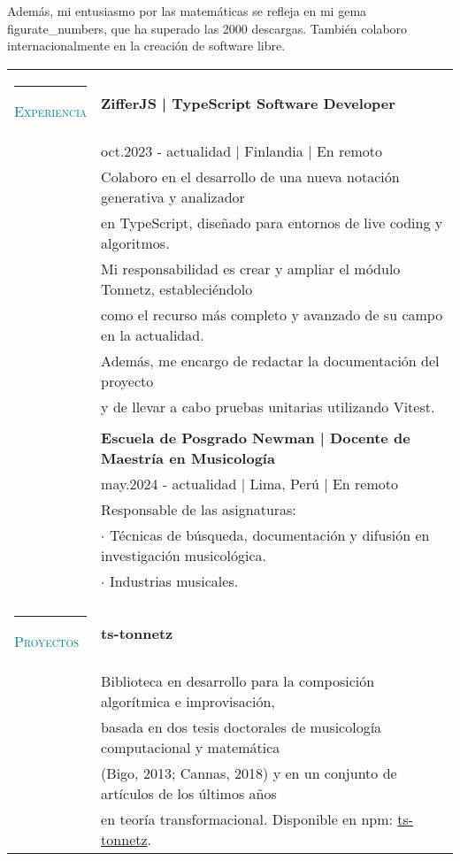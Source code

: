 \documentclass[letterpaper,10pt,oneside]{article}
\begin{document}
Además, mi entusiasmo por las matemáticas se refleja en mi gema figurate\_numbers, que ha superado las 2000 descargas. También colaboro internacionalmente en la creación de software libre.
\vspace{2em}

\noindent
\begin{tabular}{@{}l l}

  \textcolor{teal}{\rule{0.4em}{7pt}}
  \scshape{\textcolor{teal}{Experiencia}}
  & \textbf{ZifferJS | TypeScript Software Developer} \\
  &  oct.2023 - actualidad | Finlandia | En remoto \\
  & Colaboro en el desarrollo de una nueva notación generativa y analizador \\& en TypeScript, diseñado para entornos de live coding y algoritmos.  \\ &  Mi responsabilidad es crear y ampliar el módulo Tonnetz, estableciéndolo \\ &  como el recurso más completo y avanzado de su campo en la actualidad.\\&
  Además, me encargo de redactar la documentación del proyecto \\& y de llevar a cabo pruebas unitarias utilizando Vitest.\\
  & \\

  & \textbf{Escuela de Posgrado Newman | Docente de Maestría en Musicología} \\
    &  may.2024 - actualidad | Lima, Perú | En remoto \\
    & Responsable de las asignaturas: \\
    & $\cdot$ Técnicas de búsqueda, documentación y difusión en investigación musicológica.  \\
    & $\cdot$ Industrias musicales. \\
    & \\



    \textcolor{teal}{\rule{0.4em}{7pt}}
    \scshape{\textcolor{teal}{Proyectos}}
    & \textbf{ts-tonnetz} \\
    & Biblioteca en desarrollo para la composición algorítmica e improvisación, \\ & basada en dos tesis doctorales de musicología computacional y matemática \\ & (Bigo, 2013; Cannas, 2018) y en un conjunto de artículos  de los últimos años \\ & en teoría transformacional. Disponible en npm: \href{https://www.npmjs.com/package/ts-tonnetz }{{ts-tonnetz}}. \\


\end{tabular}
\end{document}
